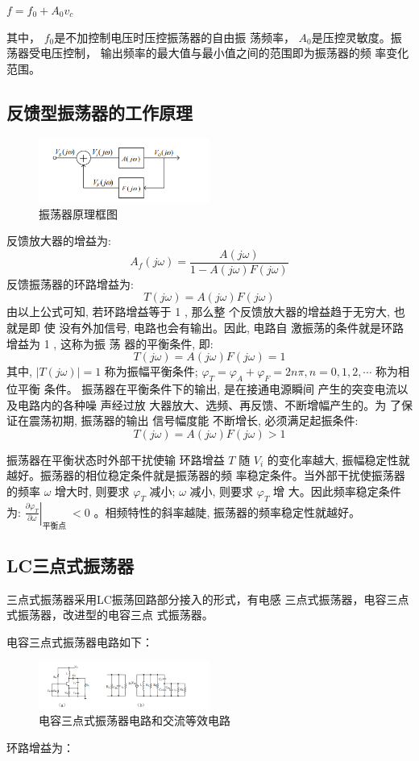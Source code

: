 \documentclass{../source/Experiment}
\begin{document}
$f = f_0 + A_0v_c$


其中， $f_0$是不加控制电压时压控振荡器的自由振
荡频率， $A_0 $是压控灵敏度。振荡器受电压控制，
输出频率的最大值与最小值之间的范围即为振荡器的频
率变化范围。

\subsection{反馈型振荡器的工作原理}
\begin{figure}[H]
    \centering
    \includegraphics[width = 0.5\textwidth]{lab3/2.png}
    \caption{振荡器原理框图}
\end{figure}
反馈放大器的增益为:
$$
    A_{f}(j \omega)=\frac{A(j \omega)}{1-A(j \omega) F(j \omega)}
$$
反馈振荡器的环路增益为:
$$
    T(j \omega)=A(j \omega) F(j \omega)
$$
由以上公式可知, 若环路增益等于 1 , 那么整
个反馈放大器的增益趋于无穷大, 也就是即 使
没有外加信号, 电路也会有输出。因此, 电路自
激振荡的条件就是环路增益为 1 , 这称为振 荡
器的平衡条件, 即:
$$
    T(j \omega)=A(j \omega) F(j \omega)=1
$$
其中, $|T(j \omega)|=1$ 称为振幅平衡条件; $\varphi_{T}=\varphi_{A}+\varphi_{F}=2 n \pi, n=0,1,2, \cdots$ 称为相位平衡 条件。
振荡器在平衡条件下的输出, 是在接通电源瞬间
产生的突变电流以及电路内的各种噪 声经过放
大器放大、选频、再反馈、不断增幅产生的。为
了保证在震荡初期, 振荡器的输出 信号幅度能
不断增长, 必须满足起振条件:
$$
    T(j \omega)=A(j \omega) F(j \omega)>1
$$

振荡器在平衡状态时外部干扰使输
环路增益 $T$ 随 $V_{i}$ 的变化率越大, 振幅稳定性就越好。振荡器的相位稳定条件就是振荡器的频 率稳定条件。当外部干扰使振荡器的频率 $\omega$ 增大时, 则要求 $\varphi_{T}$ 减小; $\omega$ 减小, 则要求 $\varphi_{T}$ 增 大。因此频率稳定条件为: $\left.\frac{\partial \varphi_{T}}{\partial \omega}\right|_{\text {平衡点 }}<0$ 。相频特性的斜率越陡, 振荡器的频率稳定性就越好。

\subsection{LC三点式振荡器}

三点式振荡器采用LC振荡回路部分接入的形式，有电感
三点式振荡器，电容三点式振荡器，改进型的电容三点
式振荡器。

电容三点式振荡器电路如下：
\begin{figure}[H]
    \centering
    \includegraphics[width = 0.5\textwidth]{lab3/3.png}
    \caption{电容三点式振荡器电路和交流等效电路}
\end{figure}
环路增益为：
\end{document}
